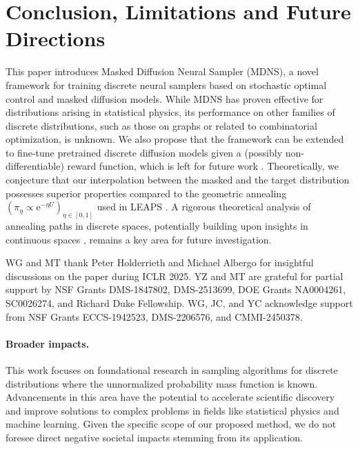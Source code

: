 \documentclass{article}
\theoremstyle{remark}
\newcommand{\e}{\mathrm{e}}
\begin{document}
%
\section{Conclusion, Limitations and Future Directions}
\label{sec:conc}
This paper introduces Masked Diffusion Neural Sampler (MDNS), a novel framework for training discrete neural samplers based on stochastic optimal control and masked diffusion models. While MDNS has proven effective for distributions arising in statistical physics, its performance on other families of discrete distributions, such as those on graphs or related to combinatorial optimization, is unknown.
We also propose that the framework can be extended to fine-tune pretrained discrete diffusion models given a (possibly non-differentiable) reward function, which is left for future work \cite{zhu2025enhancing}.
Theoretically, we conjecture that our interpolation between the masked and the target distribution possesses superior properties compared to the geometric annealing $(\pi_\eta\propto\e^{-\eta U})_{\eta\in[0,1]}$ used in LEAPS \cite{holderrieth2025leaps}. A rigorous theoretical analysis of annealing paths in discrete spaces, potentially building upon insights in continuous spaces \cite{guo2025provable,guo2025complexity}, remains a key area for future investigation.


\begin{ack}
    WG and MT thank Peter Holderrieth and Michael Albergo for insightful discussions on the paper \cite{holderrieth2025leaps} during ICLR 2025. YZ and MT are grateful for partial support by NSF Grants DMS-1847802, DMS-2513699, DOE Grants NA0004261, SC0026274, and Richard Duke Fellowship. WG, JC, and YC acknowledge support from NSF Grants ECCS-1942523, DMS-2206576, and CMMI-2450378.
\end{ack}

\newpage
\printbibliography

\newpage
\appendix

\paragraph{Broader impacts.} This work focuses on foundational research in sampling algorithms for discrete distributions where the unnormalized probability mass function is known. Advancements in this area have the potential to accelerate scientific discovery and improve solutions to complex problems in fields like statistical physics and machine learning. Given the specific scope of our proposed method, we do not foresee direct negative societal impacts stemming from its application.
\end{document}
